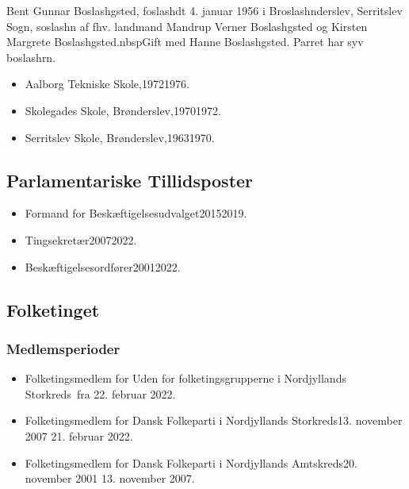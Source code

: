 \documentclass[11pt, a4paper]{awesome-cv}
\begin{document}
\makecvheader[R]
\makelettertitle
\begin{cvletter}
Bent Gunnar Boslashgsted, foslashdt 4. januar 1956 i Broslashnderslev, Serritslev Sogn, soslashn af fhv. landmand Mandrup Verner Boslashgsted og Kirsten Margrete Boslashgsted.nbspGift med Hanne Boslashgsted. Parret har syv boslashrn.

\begin{itemize}
\item Aalborg Tekniske Skole,19721976.
\item Skolegades Skole, Brønderslev,19701972.
\item Serritslev Skole, Brønderslev,19631970.
\end{itemize}
\subsection*{Parlamentariske Tillidsposter}
\begin{itemize}
\item Formand for Beskæftigelsesudvalget20152019.
\item Tingsekretær20072022.
\item Beskæftigelsesordfører20012022.
\end{itemize}
\subsection*{Folketinget}
\subsubsection*{Medlemsperioder}
\begin{itemize}
\item Folketingsmedlem for Uden for folketingsgrupperne i Nordjyllands Storkreds fra 22. februar 2022.
\item Folketingsmedlem for Dansk Folkeparti i Nordjyllands Storkreds13. november 2007  21. februar 2022.
\item Folketingsmedlem for Dansk Folkeparti i Nordjyllands Amtskreds20. november 2001  13. november 2007.
\end{itemize}

\end{cvletter}
\end{document}
